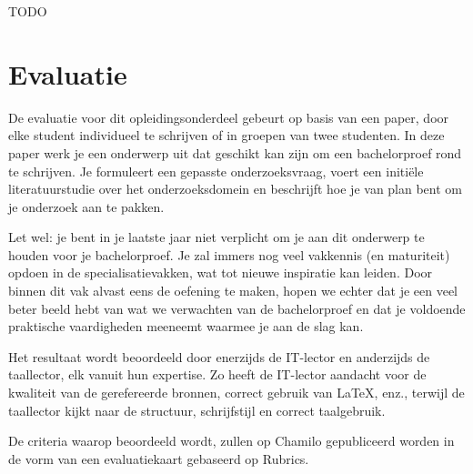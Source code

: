 TODO

\section{Evaluatie}%
\label{sec:evaluatie}

De evaluatie voor dit opleidingsonderdeel gebeurt op basis van een paper, door elke student individueel te schrijven of in groepen van twee studenten. In deze paper werk je een onderwerp uit dat geschikt kan zijn om een bachelorproef rond te schrijven. Je formuleert een gepasste onderzoeksvraag, voert een initiële literatuurstudie over het onderzoeksdomein en beschrijft hoe je van plan bent om je onderzoek aan te pakken. 

Let wel: je bent in je laatste jaar niet verplicht om je aan dit onderwerp te houden voor je bachelorproef. Je zal immers nog veel vakkennis (en maturiteit) opdoen in de specialisatievakken, wat tot nieuwe inspiratie kan leiden. Door binnen dit vak alvast eens de oefening te maken, hopen we echter dat je een veel beter beeld hebt van wat we verwachten van de bachelorproef en dat je voldoende praktische vaardigheden meeneemt waarmee je aan de slag kan.

Het resultaat wordt beoordeeld door enerzijds de IT-lector en anderzijds de taallector, elk vanuit hun expertise. Zo heeft de IT-lector aandacht voor de kwaliteit van de gerefereerde bronnen, correct gebruik van {\LaTeX}, enz., terwijl de taallector kijkt naar de structuur, schrijfstijl en correct taalgebruik.

De criteria waarop beoordeeld wordt, zullen op Chamilo gepubliceerd worden in de vorm van een evaluatiekaart gebaseerd op Rubrics.
